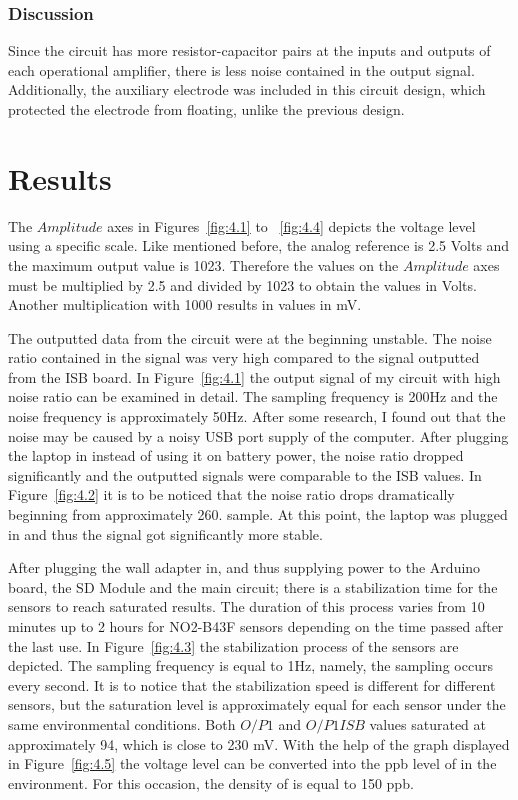 \subsection{Discussion}
Since the circuit has more resistor-capacitor pairs at the inputs and outputs of each operational amplifier, there is less noise contained in the output signal. Additionally, the auxiliary electrode was included in this circuit design, which protected the electrode from floating, unlike the previous design.

\chapter{Results}
The $Amplitude$ axes in Figures~\ref{fig:4.1} to ~\ref{fig:4.4} depicts the voltage level using a specific scale. Like mentioned before, the analog reference is 2.5 Volts and the maximum output value is 1023. Therefore the values on the $Amplitude$ axes must be multiplied by 2.5 and divided by 1023 to obtain the values in Volts. Another multiplication with 1000 results in values in mV. \par    
The outputted data from the circuit were at the beginning unstable. The noise ratio contained in the signal was very high compared to the signal outputted from the ISB board. In Figure~\ref{fig:4.1} the output signal of my circuit with high noise ratio can be examined in detail. The sampling frequency is 200Hz and the noise frequency is approximately 50Hz. After some research, I found out that the noise may be caused by a noisy USB port supply of the computer. After plugging the laptop in instead of using it on battery power, the noise ratio dropped significantly and the outputted signals were comparable to the ISB values. In Figure~\ref{fig:4.2} it is to be noticed that the noise ratio drops dramatically beginning from approximately 260. sample. At this point, the laptop was plugged in and thus the signal got significantly more stable. \par 
After plugging the wall adapter in, and thus supplying power to the Arduino board, the SD Module and the main circuit; there is a stabilization time for the sensors to reach saturated results. The duration of this process varies from 10 minutes up to 2 hours for NO2-B43F sensors depending on the time passed after the last use. \cite{FAQs} In Figure~\ref{fig:4.3} the stabilization process of the sensors are depicted. The sampling frequency is equal to 1Hz, namely, the sampling occurs every second. It is to notice that the stabilization speed is different for different sensors, but the saturation level is approximately equal for each sensor under the same environmental conditions. Both $O/P1$ and $O/P1 ISB$ values saturated at approximately 94, which is close to 230 mV. With the help of the graph displayed in Figure~\ref{fig:4.5} the voltage level can be converted into the ppb level of  in the environment. For this occasion, the density of  is equal to 150 ppb. \par 
